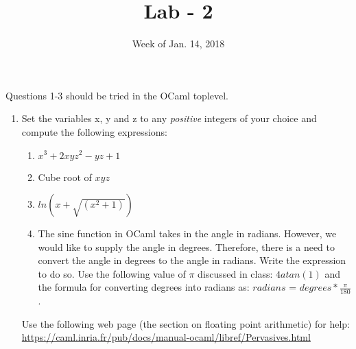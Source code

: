 \documentclass{article}
\title{Lab - 2}
\date{Week of Jan. 14, 2018}
\begin{document}
\maketitle

Questions 1-3 should be tried in the OCaml toplevel.
\begin{enumerate}

\item Set the variables x, y and z to any \emph{positive} integers of your choice and compute the following expressions:
	\begin{enumerate}
		\item $x^3 + 2xyz^2 − yz + 1$
		\item Cube root of $xyz$
		\item $ln (x + \sqrt{(x^2 + 1)})$
		\item The sine function in OCaml takes in the angle in radians. However, we would like to supply the angle in degrees. Therefore, there is a need to convert the angle in degrees to the angle in radians. Write the expression to do so. Use the following value of $\pi$ discussed in class: $4atan(1)$ and the formula for converting degrees into radians as: 
		$radians$ = $degrees * \frac{\pi}{180}$.
	\end{enumerate}
Use the following web page (the section on floating point arithmetic) for help: \url{https://caml.inria.fr/pub/docs/manual-ocaml/libref/Pervasives.html}


\end{enumerate}
\end{document}
